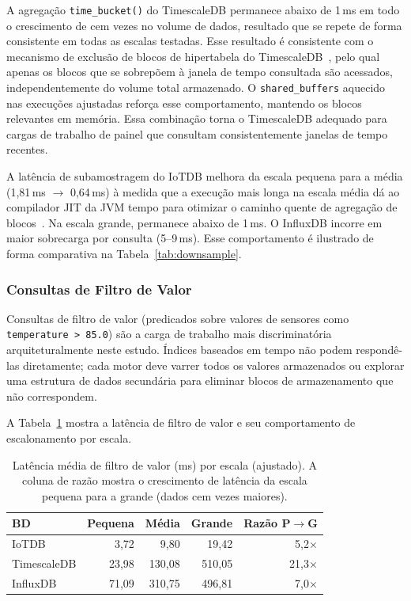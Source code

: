 A agregação \texttt{time\_bucket()} do TimescaleDB permanece abaixo de 1\,ms em todo o
crescimento de cem vezes no volume de dados, resultado que se repete de forma consistente em todas as escalas testadas. Esse resultado é consistente com o mecanismo de exclusão de blocos de hipertabela do
TimescaleDB~\citep{timescaledb}, pelo qual apenas os blocos que se sobrepõem à janela de
tempo consultada são acessados, independentemente do volume total armazenado. O \texttt{shared\_buffers} aquecido nas
execuções ajustadas reforça esse comportamento, mantendo os blocos relevantes em memória.
Essa combinação torna o TimescaleDB adequado para cargas de trabalho de painel que
consultam consistentemente janelas de tempo recentes.

A latência de subamostragem do IoTDB melhora da escala pequena para a média
(1,81\,ms $\to$ 0,64\,ms) à medida que a execução mais longa na escala média dá ao compilador
JIT da JVM tempo para otimizar o caminho quente de agregação de blocos~\citep{barrett2017warmup}. Na escala grande,
permanece abaixo de 1\,ms. O InfluxDB incorre em maior sobrecarga por consulta (5--9\,ms). Esse comportamento
é ilustrado de forma comparativa na Tabela~\ref{tab:downsample}.

\subsubsection{Consultas de Filtro de Valor}

Consultas de filtro de valor (predicados sobre valores de sensores como
\texttt{temperature > 85.0}) são a carga de trabalho mais discriminatória arquiteturalmente
neste estudo. Índices baseados em tempo não podem respondê-las diretamente; cada motor deve
varrer todos os valores armazenados ou explorar uma estrutura de dados secundária para eliminar
blocos de armazenamento que não correspondem.

A Tabela~\ref{tab:vfilter} mostra a latência de filtro de valor e seu comportamento de
escalonamento por escala.

\begin{table}[t]
  \centering
  \caption{Latência média de filtro de valor (ms) por escala (ajustado).
    A coluna de razão mostra o crescimento de latência da escala pequena para a grande
  (dados cem vezes maiores).}
  \label{tab:vfilter}
  \begin{tabular}{lrrrr}
    \hline
    \textbf{BD} & \textbf{Pequena} & \textbf{Média} & \textbf{Grande} & \textbf{Razão P$\to$G} \\
    \hline
    IoTDB       &   3,72 &    9,80 &   19,42 &  5,2$\times$ \\
    TimescaleDB &  23,98 &  130,08 &  510,05 & 21,3$\times$ \\
    InfluxDB    &  71,09 &  310,75 &  496,81 &  7,0$\times$ \\
    \hline
  \end{tabular}
\end{table}

